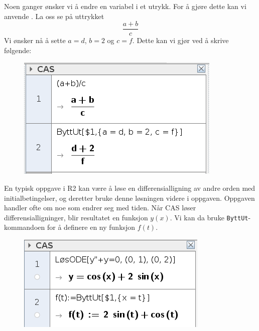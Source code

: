 Noen ganger ønsker vi å endre en variabel i et utrykk. For å gjøre dette kan vi anvende . La oss se på uttrykket
\[ \frac{a+b}{c} \]
Vi ønsker nå å sette $ {a=d }$, $ {b=2} $ og $ {c=f} $. Dette kan vi gjør ved å skrive følgende:
\begin{figure}
	\centering
	\includegraphics[scale=0.5]{fig/cas2}
\end{figure}

En typisk oppgave i R2 kan være å løse en differensialligning av andre orden med initialbetingelser, og deretter bruke denne løsningen videre i oppgaven. Oppgaven handler ofte om noe som endrer seg med tiden. Når CAS løser differensialligninger, blir resultatet en funksjon $ y(x) $. Vi kan da bruke \texttt{ByttUt}-kommandoen for å definere en ny funksjon $ f(t) $.
\begin{figure}
	\centering
	\includegraphics[scale=0.5]{fig/ode}
\end{figure}



